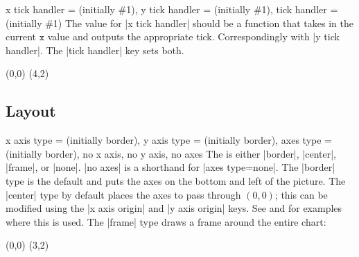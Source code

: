 \begin{sseqdata}[name = basic, cohomological Serre grading]
\begin{keylist}{%
    x tick handler =  (initially \#1),%
    y tick handler =  (initially \#1),%
    tick handler =  (initially \#1)%
}
The value for |x tick handler| should be a function that takes in the current
$\mathtt{x}$ value and outputs the appropriate tick. Correspondingly with%
|y tick handler|. The |tick handler| key sets both.
\begin{codeexample}[width = 7cm]
\begin{sseqpage}[ x range = {0}{4}, yscale = 1.78,
    x tick handler = {
        \ifnum#1 = 0\relax
            0
        \else
            \ifnum#1 = 1\relax
                \protect\vphantom{2}n
            \else
                #1n
            \fi
        \fi
    }
]
\class(0,0)
\class(4,2)
\end{sseqpage}
\end{codeexample}
\end{keylist}

\subsection{Layout}
\begin{keylist}{%
    x axis type =  (initially border),%
    y axis type =  (initially border),%
    axes type =  (initially border),%
    no x axis,%
    no y axis,%
    no axes%
}%
The  is either |border|, |center|, |frame|, or |none|. |no axes| is a
shorthand for |axes type=none|. The |border| type is the default and puts the
axes on the bottom and left of the picture. The |center| type by default places
the axes to pass through $(0,0)$; this can be modified using the |x axis origin|
and |y axis origin| keys. See  and  for
examples where this is used. The |frame| type draws a frame around the entire
chart:

\begin{codeexample}[width=6cm]
\begin{sseqpage}[ axes type = frame ]
\class(0,0)
\class(3,2)
\end{sseqpage}
\end{codeexample}
\end{keylist}


\end{sseqdata}
